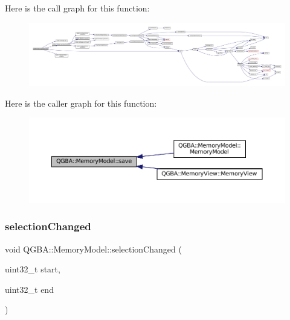 Here is the call graph for this function\+:
\nopagebreak
\begin{figure}[H]
\begin{center}
\leavevmode
\includegraphics[width=350pt]{class_q_g_b_a_1_1_memory_model_afa1d14d0c9d9fbac5d54d5808b75ca11_cgraph}
\end{center}
\end{figure}
Here is the caller graph for this function\+:
\nopagebreak
\begin{figure}[H]
\begin{center}
\leavevmode
\includegraphics[width=350pt]{class_q_g_b_a_1_1_memory_model_afa1d14d0c9d9fbac5d54d5808b75ca11_icgraph}
\end{center}
\end{figure}
\mbox{\label{class_q_g_b_a_1_1_memory_model_a0fa24be2f52e936661ef0923c4ed77f5}} 
\subsubsection{\texorpdfstring{selection\+Changed}{selectionChanged}}
{\footnotesize\ttfamily void Q\+G\+B\+A\+::\+Memory\+Model\+::selection\+Changed (\begin{DoxyParamCaption}\item[{uint32\+\_\+t}]{start,  }\item[{uint32\+\_\+t}]{end }\end{DoxyParamCaption})\hspace{0.3cm}{\ttfamily [signal]}}

